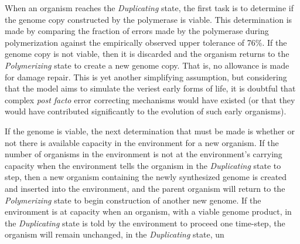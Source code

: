 When an organism reaches the \emph{Duplicating} state, the first task is to determine if the genome copy constructed by the polymerase is viable. This determination is made by comparing the fraction of errors made by the polymerase during polymerization against the empirically observed upper tolerance of 76\%. If the genome copy is not viable, then it is discarded and the organism returns to the \emph{Polymerizing} state to create a new genome copy. That is, no allowance is made for damage repair. This is yet another simplifying assumption, but considering that the model aims to simulate the veriest early forms of life, it is doubtful that complex \emph{post facto} error correcting mechanisms would have existed (or that they would have contributed significantly to the evolution of such early organisms).

If the genome is viable, the next determination that must be made is whether or not there is available capacity in the environment for a new organism. If the number of organisms in the environment is not at the environment's carrying capacity when the environment tells the organism in the \emph{Duplicating} state to step, then a new organism containing the newly synthesized genome is created and inserted into the environment, and the parent organism will return to the \emph{Polymerizing} state to begin construction of another new genome. If the environment is at capacity when an organism, with a viable genome product, in the \emph{Duplicating} state is told by the environment to proceed one time-step, the organism will remain unchanged, in the \emph{Duplicating} state, un

